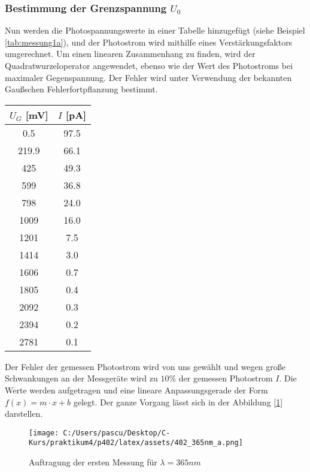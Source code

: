 \documentclass{article}
\begin{document}
\subsubsection*{Bestimmung der Grenzspannung $U_0$}
Nun werden die Photospannungswerte in einer Tabelle hinzugefügt 
(siehe Beispiel \ref{tab:messung1a}), und der Photostrom wird mithilfe 
eines Verstärkungsfaktors umgerechnet. Um einen linearen Zusammenhang zu 
finden, wird der Quadratwurzeloperator angewendet, ebenso wie der Wert des 
Photostroms bei maximaler Gegenspannung. Der Fehler wird unter Verwendung der bekannten
 Gaußschen Fehlerfortpflanzung bestimmt.

\begin{table*}[h!]
  \centering
  \begin{tabular}{|c|c|}
      \hline
      $U_G$ [mV] & $I$ [pA] \\
      \hline
      0.5   & 97.5 \\
      219.9 & 66.1 \\
      425   & 49.3 \\
      599   & 36.8 \\
      798   & 24.0 \\
      1009  & 16.0 \\
      1201  & 7.5  \\
      1414  & 3.0  \\
      1606  & 0.7  \\
      1805  & 0.4  \\
      2092  & 0.3  \\
      2394  & 0.2  \\
      2781  & 0.1  \\
      \hline
  \end{tabular}
  \caption{erste Messung bei 365 nm}
  \label{tab:messung1a}
\end{table*}
Der Fehler der gemessen Photostrom wird von uns gewählt und wegen große Schwankungen an der Messgeräte 
wird zu $10\%$ der gemessen Photostrom $I$.
Die Werte werden aufgetragen und eine lineare Anpassungsgerade der Form 
$f(x) = m \cdot x + b $ gelegt. Der ganze Vorgang lässt sich in der Abbildung [\ref*{fig:wellenlaenge_365nm_a}]
darstellen. 
\begin{figure}[h!]
  \centering
  \texttt{[image: C:/Users/pascu/Desktop/C-Kurs/praktikum4/p402/latex/assets/402\_365nm\_a.png]}
  \caption{Auftragung der ersten Messung für $ \lambda =365nm$}
  \label{fig:wellenlaenge_365nm_a}
\end{figure}
\newpage
\end{document}
